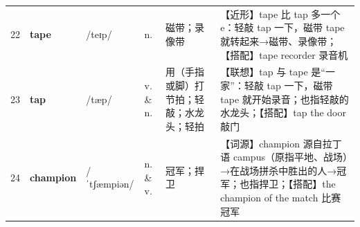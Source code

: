 \documentclass[UTF8,a4paper,11pt,oneside]{ctexbook}
\newcommand{\cellword}[1]{{\bfseries\textcolor{wordcol}{#1}}}
\newcommand{\cellipa}[1]{{\footnotesize\textcolor{ipacol}{#1}}}
\newcommand{\cellpos}[1]{\textcolor{poscol}{#1}}
\newcommand{\cellno}[1]{\textcolor{volcolor!75!black}{#1}}
\begin{document}
{\begin{longtable}{@{}C{0.045\textwidth}L{0.155\textwidth}L{0.175\textwidth}C{0.070\textwidth}L{0.180\textwidth}L{0.282\textwidth}@{}}
\cellno{22} & \cellword{tape} & \cellipa{/teɪp/} & \cellpos{n.} & 磁带；录像带 & \textcolor{tagNear}{【近形】}tape 比 tap 多一个 e：轻敲 tap 一下，磁带 tape 就转起来→\allowbreak{}磁带、录像带；\textcolor{tagColloc}{【搭配】}tape recorder 录音机 \\
 \cellno{23} & \cellword{tap} & \cellipa{/tæp/} & \cellpos{v.  \& n.} & 用（手指或脚）打节拍；轻敲；水龙头；轻拍 & \textcolor{tagAssoc}{【联想】}tap 与 tape 是“一家”：轻敲 tap 一下，磁带 tape 就开始录音；也指轻敲的水龙头；\textcolor{tagColloc}{【搭配】}tap the door 敲门 \\
\cellno{24} & \cellword{champion} & \cellipa{/ˈtʃæmpiən/} & \cellpos{n.  \& v.} & 冠军；捍卫 & \textcolor{tagEtym}{【词源】}champion 源自拉丁语 campus（原指平地、战场）→\allowbreak{}在战场拼杀中胜出的人→\allowbreak{}冠军；也指捍卫；\textcolor{tagColloc}{【搭配】}the champion of the match 比赛冠军 \\
\end{longtable}
}

\end{document}
